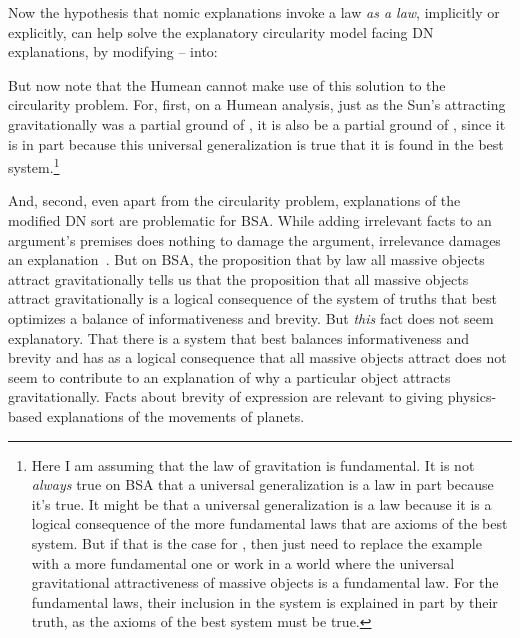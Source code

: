 Now the hypothesis that nomic explanations invoke a law \textit{as a law}, implicitly or explicitly, can help solve the explanatory 
circularity model facing DN explanations, by modifying -- into:

But now note that the Humean cannot make use of this solution to the circularity problem. For, first, on a Humean analysis, just as 
the Sun's attracting gravitationally was a partial ground of , it is also be a partial ground of , 
since it is in part because this universal generalization is true that it is found in the best 
system.\footnote{Here I am assuming that the law of gravitation is fundamental. It is not \textit{always} true on BSA that a universal generalization is a law in part because it's true. 
It might be that a universal generalization is a law because it is a logical consequence of the more fundamental laws that are axioms of the 
best system. But if that is the case for , then just need to replace the example with a more fundamental one or work 
in a world where the universal gravitational attractiveness of massive objects is a fundamental law. For the 
fundamental laws, their inclusion in the system is explained in part by their truth, as the axioms of the best system must
be true.} 

And, second, even apart from the circularity problem, explanations of the modified DN sort are problematic for BSA.
While adding irrelevant facts to an argument's premises does nothing to damage the argument, irrelevance
damages an explanation~\cite{SalmonStat}. But on BSA, the proposition that by law all massive objects attract gravitationally tells us
that the proposition that all massive objects attract gravitationally is a logical consequence of the system
of truths that best optimizes a balance of informativeness and brevity. But \textit{this} fact does not seem explanatory.
That there is a system that best balances informativeness and brevity and has as a logical consequence that all massive
objects attract does not seem to contribute to an explanation of why a particular object attracts gravitationally. Facts 
about brevity of expression are relevant to giving physics-based explanations of the movements of planets. 


